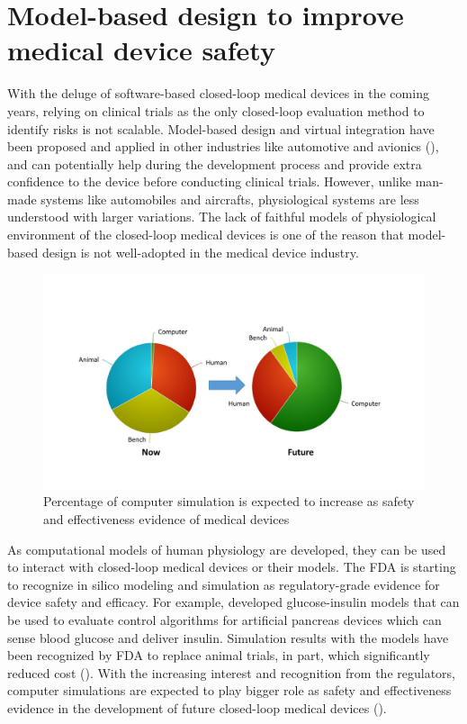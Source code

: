 \section{Model-based design to improve medical device safety}
With the deluge of software-based closed-loop medical devices in the coming years, relying on clinical trials as the only closed-loop evaluation method to identify risks is not scalable. Model-based design and virtual integration have been proposed and applied in other industries like automotive and avionics (\cite{autosar, avsi}), and can potentially help during the development process and provide extra confidence to the device before conducting clinical trials. However, unlike man-made systems like automobiles and aircrafts, physiological systems are less understood with larger variations. The lack of faithful models of physiological environment of the closed-loop medical devices is one of the reason that model-based design is not well-adopted in the medical device industry. 
\begin{figure}[t]
		\centering
		\includegraphics[width=\textwidth]{figs/MDIC.pdf}
		\caption{\small Percentage of computer simulation is expected to increase as safety and effectiveness evidence of medical devices}
		\label{fig:MDIC}
\end{figure}

As computational models of human physiology are developed, they can be used to interact with closed-loop medical devices or their models. The FDA is starting to recognize in silico modeling and simulation as regulatory-grade evidence for device safety and efficacy. For example, \cite{pancreas_paul} developed glucose-insulin models that can be used to evaluate control algorithms for artificial pancreas devices which can sense blood glucose and deliver insulin. Simulation results with the models have been recognized by FDA to replace animal trials, in part, which significantly reduced cost (\cite{pancreas}). With the increasing interest and recognition from the regulators, computer simulations are expected to play bigger role as safety and effectiveness evidence in the development of future closed-loop medical devices ().

